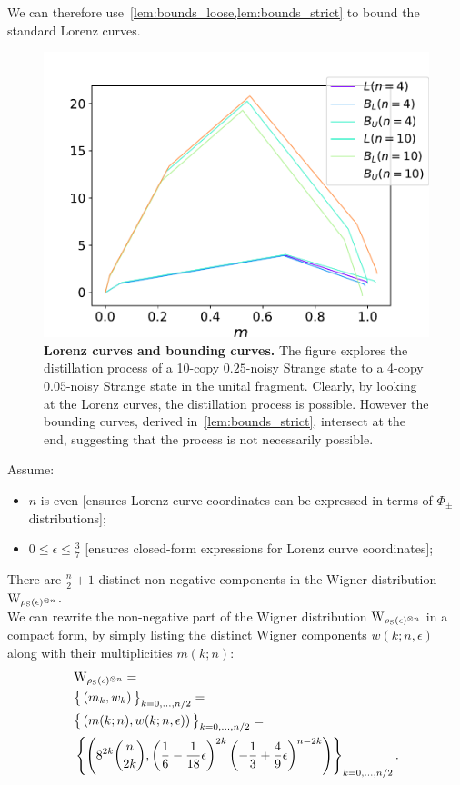 We can therefore use~\cref{lem:bounds_loose,lem:bounds_strict} to bound the standard Lorenz curves.
\begin{figure}[b]
    \centering
    \includegraphics[scale=0.4]{figs/lc_bounds.pdf}
    \caption{\textbf{Lorenz curves and bounding curves.} 
    The figure explores the distillation process of a 10-copy $0.25$-noisy Strange state to a 4-copy $0.05$-noisy Strange state in the unital fragment.
    Clearly, by looking at the Lorenz curves, the distillation process is possible.
    However the bounding curves, derived in~\cref{lem:bounds_strict}, intersect at the end, suggesting that the process is not necessarily possible.
    }
    \label{fig:lc_bounds}
\end{figure}


Assume: 
\begin{itemize}
    \item $n$ is even [ensures Lorenz curve coordinates can be expressed in terms of $\Phi_{\pm}$ distributions];
    \item $0 \leq \epsilon \leq \frac{3}{7}$ [ensures closed-form expressions for Lorenz curve coordinates];
\end{itemize}
There are $\frac{n}{2}+1$ distinct non-negative components in the Wigner distribution $\W{\noisysn}$.\\

We can rewrite the non-negative part of the Wigner distribution $\W{\noisysn}$ in a compact form, by simply listing the distinct Wigner components $w(k; n, \epsilon)$ along with their multiplicities $m(k; n)$:
\begin{align}
    &{\W{\noisysn}} = \\ 
    &\big\{\left( m_k, w_k \right)\big\}_{k=0,\dots,n/2} = \nonumber\\ 
    &\big\{\left( m(k; n), w(k; n, \epsilon) \right)\big\}_{k=0,\dots,n/2} = \nonumber\\
    &\left\{ \left( 8^{2k}\binom{n}{2k}, \left( \frac{1}{6} - \frac{1}{18}\epsilon \right)^{2k}\left( -\frac{1}{3} + \frac{4}{9}\epsilon \right)^{n-2k} \right) \right\}_{k=0,\dots,n/2}. \nonumber
\end{align}

